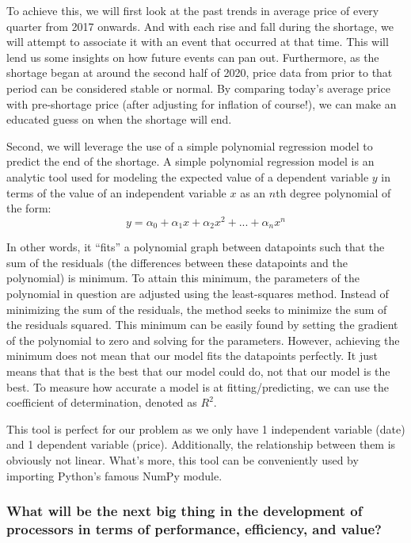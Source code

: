 \documentclass[conference]{IEEEtran}
\begin{document}
To achieve this, we will first look at the past trends in average price of
every quarter from 2017 onwards. And with each rise and fall during the
shortage, we will attempt to associate it with an event that occurred at that
time. This will lend us some insights on how future events can pan out.
Furthermore, as the shortage began at around the second half of 2020, price
data from prior to that period can be considered stable or normal. By
comparing today’s average price with pre-shortage price (after adjusting for
inflation of course!), we can make an educated guess on when the shortage
will end.

Second, we will leverage the use of a simple polynomial regression model to
predict the end of the shortage.
A simple polynomial regression model is an analytic tool used for modeling the
expected value of a dependent variable $y$ in terms of the value of an
independent variable $x$ as an $n$th degree polynomial of the form:
\[y = \alpha_{0} + \alpha_{1}x + \alpha_{2}x^{2} + ... + \alpha_{n}x^{n}\]

In other words, it ``fits'' a polynomial graph between datapoints such that the
sum of the residuals (the differences between these datapoints and the
polynomial) is minimum. To attain this minimum, the parameters of the
polynomial in question are adjusted using the least-squares method. Instead of
minimizing the sum of the residuals, the method seeks to minimize the
sum of the residuals squared. This minimum can be easily found by setting the
gradient of the polynomial to zero and solving for the parameters. However,
achieving the minimum does not mean that our model fits the datapoints
perfectly. It just means that that is the best that our model could do, not
that our model is the best. To measure how accurate a model is at
fitting/predicting, we can use the coefficient of determination,
denoted as $R^{2}$.

This tool is perfect for our problem as we only have 1 independent variable
(date) and 1 dependent variable (price). Additionally, the relationship between
them is obviously not linear. What's more, this tool can be conveniently used
by importing Python's famous NumPy module.

\subsubsection{What will be the next big thing in the development of
	processors in terms of performance, efficiency, and value?}
\end{document}
